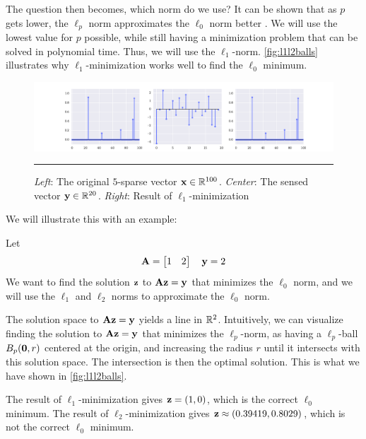 The question then becomes, which norm do we use? It can be shown that  as $ p $ gets lower, the $ \ell_{p} $ norm approximates the $ \ell_{0} $ norm better \cite[Section 4.1]{foucart13intro}. We will use the lowest value for $ p $ possible, while still having a minimization problem that can be solved in polynomial time. Thus, we will use the $ \ell_{1} $-norm. \cref{fig:l1l2balls} illustrates why $ \ell_{1} $-minimization works well to find the $ \ell_{0} $ minimum. 
\begin{figure}[t]
	\centering
	\includegraphics[width=\textwidth]{figs/figure_1h.pdf}
	\caption{\textit{Left}: The original $ 5 $-sparse vector $ \mathbf{x} \in \mathbb{R}^{100} $. \textit{Center}: The sensed vector $ \mathbf{y} \in \mathbb{R}^{20} $. \textit{Right}: Result of $ \ell_{1} $-minimization}
	\label{fig:l1min}
	\vspace{4pt}\hrule
\end{figure}

We will illustrate this with an example:

\begin{example} \label{ex:l1l2min}
Let
\[ 
	\mathbf{A} = \begin{bmatrix}1 & 2\end{bmatrix} \quad \mathbf{y} = 2
\]
We want to find the solution $ \mathbf{z} $ to $ \mathbf{A}\mathbf{z} = \mathbf{y} $ that minimizes the $ \ell_{0} $ norm, and we will use the $ \ell_{1} $ and $ \ell_{2} $ norms to approximate the $ \ell_{0} $ norm.

The solution space to $ \mathbf{A}\mathbf{z} = \mathbf{y} $ yields a line in $ \mathbb{R}^{2} $. Intuitively, we can visualize finding the solution to $ \mathbf{A}\mathbf{z} = \mathbf{y} $ that minimizes the $ \ell_{p} $-norm, as having a $ \ell_{p} $-ball $ B_{p}(\mathbf{0}, r) $ centered at the origin, and increasing the radius $ r $ until it intersects with this solution space. The intersection is then the optimal solution. This is what we have shown in \cref{fig:l1l2balls}.

The result of $ \ell_{1} $-minimization gives $ \mathbf{z} = (1, 0) $, which is the correct $ \ell_{0} $ minimum. The result of $ \ell_{2} $-minimization gives $ \mathbf{z} \approx (0.39419, 0.8029) $, which is not the correct $ \ell_{0} $ minimum. 
\end{example}



